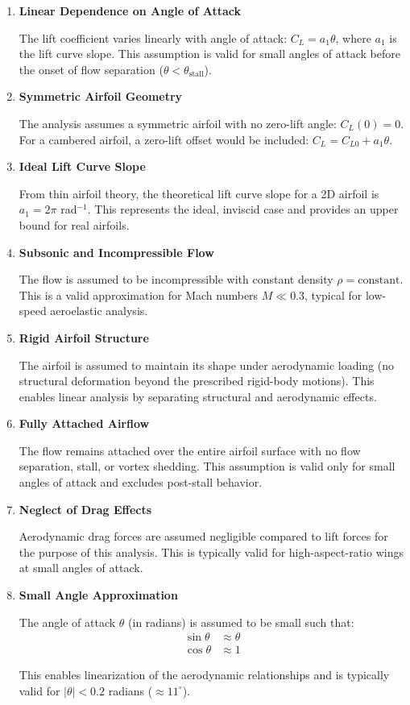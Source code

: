 \documentclass{article}
\begin{document}
\begin{enumerate}
\item \textbf{Linear Dependence on Angle of Attack}

   The lift coefficient varies linearly with angle of attack: $C_L = a_1 \theta$, where $a_1$ is the lift curve slope. This assumption is valid for small angles of attack before the onset of flow separation ($\theta < \theta_{\text{stall}}$).

\item \textbf{Symmetric Airfoil Geometry}

   The analysis assumes a symmetric airfoil with no zero-lift angle: $C_L(0) = 0$. For a cambered airfoil, a zero-lift offset would be included: $C_L = C_{L0} + a_1 \theta$.

\item \textbf{Ideal Lift Curve Slope}

   From thin airfoil theory, the theoretical lift curve slope for a 2D airfoil is $a_1 = 2\pi$ rad$^{-1}$. This represents the ideal, inviscid case and provides an upper bound for real airfoils.

\item \textbf{Subsonic and Incompressible Flow}

   The flow is assumed to be incompressible with constant density $\rho = \text{constant}$. This is a valid approximation for Mach numbers $M \ll 0.3$, typical for low-speed aeroelastic analysis.

\item \textbf{Rigid Airfoil Structure}

   The airfoil is assumed to maintain its shape under aerodynamic loading (no structural deformation beyond the prescribed rigid-body motions). This enables linear analysis by separating structural and aerodynamic effects.

\item \textbf{Fully Attached Airflow}

   The flow remains attached over the entire airfoil surface with no flow separation, stall, or vortex shedding. This assumption is valid only for small angles of attack and excludes post-stall behavior.

\item \textbf{Neglect of Drag Effects}

   Aerodynamic drag forces are assumed negligible compared to lift forces for the purpose of this analysis. This is typically valid for high-aspect-ratio wings at small angles of attack.

\item \textbf{Small Angle Approximation}

   The angle of attack $\theta$ (in radians) is assumed to be small such that:
   \begin{align}
   \sin \theta &\approx \theta \\
   \cos \theta &\approx 1
   \end{align}

   This enables linearization of the aerodynamic relationships and is typically valid for $|\theta| < 0.2$ radians ($\approx 11^{\circ}$).

\end{enumerate}
\end{document}
